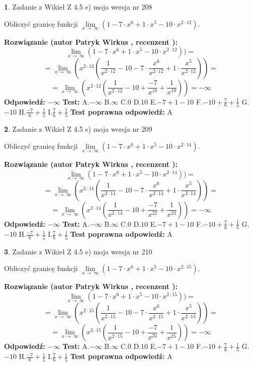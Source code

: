 \documentclass[12pt, a4paper]{article}
\theoremstyle{definition} %
\newtheorem{zad}{}
\newcommand{\zadStart}[1]{\begin{zad}#1\newline}
\newcommand{\zadStop}{\end{zad}}
\newcommand{\rozwStart}[2]{\noindent \textbf{Rozwiązanie (autor #1 , recenzent #2): }\newline}
\newcommand{\rozwStop}{\newline}
\newcommand{\odpStart}{\noindent \textbf{Odpowiedź:}\newline}
\newcommand{\odpStop}{\newline}
\newcommand{\testStart}{\noindent \textbf{Test:}\newline}
\newcommand{\testStop}{\newline}
\newcommand{\kluczStart}{\noindent \textbf{Test poprawna odpowiedź:}\newline}
\newcommand{\kluczStop}{\newline}
\begin{document}
\zadStart{Zadanie z Wikieł Z 4.5 e) moja wersja nr 208}



Obliczyć granicę funkcji  $\lim\limits_{x\to\ \infty}(1 - 7 \cdot x^{6}+1 \cdot x^{5}- 10 \cdot x^{2\cdot12})$.
\zadStop
\rozwStart{Patryk Wirkus}{}
$$\lim\limits_{x\to\ \infty}(1 - 7 \cdot x^{6}+1 \cdot x^{5}- 10 \cdot x^{2\cdot12}))=$$
$$=\lim\limits_{x\to\ \infty}(x^{2\cdot12}(\frac{1}{x^{2\cdot12}}-10 -7 \cdot \frac{x^{6}}{x^{2\cdot12}}+1 \cdot \frac{x^{5}}{x^{2\cdot12}}))=$$
$$=\lim\limits_{x\to\ \infty}(x^{2\cdot12}(\frac{1}{x^{2\cdot12}}-10 + \frac{-7}{x^{18}}+ \frac{1}{x^{19}}))=-\infty$$
\rozwStop
\odpStart
$-\infty$
\odpStop
\testStart
A.$-\infty$ B.$\infty$ C.$0$ D.$10$ E.$-7 + 1 - 10$
F.$-10+\frac{7}{6}+\frac{1}{5}$ G.$-10$
H.$\frac{-7}{6}+\frac{1}{5}$
I.$\frac{7}{6}+\frac{1}{5}$
\testStop
\kluczStart
A
\kluczStop



\zadStart{Zadanie z Wikieł Z 4.5 e) moja wersja nr 209}



Obliczyć granicę funkcji  $\lim\limits_{x\to\ \infty}(1 - 7 \cdot x^{6}+1 \cdot x^{5}- 10 \cdot x^{2\cdot14})$.
\zadStop
\rozwStart{Patryk Wirkus}{}
$$\lim\limits_{x\to\ \infty}(1 - 7 \cdot x^{6}+1 \cdot x^{5}- 10 \cdot x^{2\cdot14}))=$$
$$=\lim\limits_{x\to\ \infty}(x^{2\cdot14}(\frac{1}{x^{2\cdot14}}-10 -7 \cdot \frac{x^{6}}{x^{2\cdot14}}+1 \cdot \frac{x^{5}}{x^{2\cdot14}}))=$$
$$=\lim\limits_{x\to\ \infty}(x^{2\cdot14}(\frac{1}{x^{2\cdot14}}-10 + \frac{-7}{x^{22}}+ \frac{1}{x^{23}}))=-\infty$$
\rozwStop
\odpStart
$-\infty$
\odpStop
\testStart
A.$-\infty$ B.$\infty$ C.$0$ D.$10$ E.$-7 + 1 - 10$
F.$-10+\frac{7}{6}+\frac{1}{5}$ G.$-10$
H.$\frac{-7}{6}+\frac{1}{5}$
I.$\frac{7}{6}+\frac{1}{5}$
\testStop
\kluczStart
A
\kluczStop



\zadStart{Zadanie z Wikieł Z 4.5 e) moja wersja nr 210}



Obliczyć granicę funkcji  $\lim\limits_{x\to\ \infty}(1 - 7 \cdot x^{6}+1 \cdot x^{5}- 10 \cdot x^{2\cdot15})$.
\zadStop
\rozwStart{Patryk Wirkus}{}
$$\lim\limits_{x\to\ \infty}(1 - 7 \cdot x^{6}+1 \cdot x^{5}- 10 \cdot x^{2\cdot15}))=$$
$$=\lim\limits_{x\to\ \infty}(x^{2\cdot15}(\frac{1}{x^{2\cdot15}}-10 -7 \cdot \frac{x^{6}}{x^{2\cdot15}}+1 \cdot \frac{x^{5}}{x^{2\cdot15}}))=$$
$$=\lim\limits_{x\to\ \infty}(x^{2\cdot15}(\frac{1}{x^{2\cdot15}}-10 + \frac{-7}{x^{24}}+ \frac{1}{x^{25}}))=-\infty$$
\rozwStop
\odpStart
$-\infty$
\odpStop
\testStart
A.$-\infty$ B.$\infty$ C.$0$ D.$10$ E.$-7 + 1 - 10$
F.$-10+\frac{7}{6}+\frac{1}{5}$ G.$-10$
H.$\frac{-7}{6}+\frac{1}{5}$
I.$\frac{7}{6}+\frac{1}{5}$
\testStop
\kluczStart
A
\kluczStop
\end{document}
